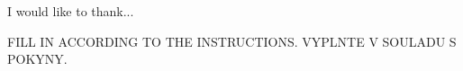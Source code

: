\documentclass[english,bachelor,unicode,oneside,bw]{ctufit-thesis}
\begin{document}
 
\frontmatter\frontmatterinit %


\thispagestyle{empty}\cleardoublepage\maketitle %

\imprintpage %

\tableofcontents %
\listoffigures %
\begingroup
\let\clearpage\relax
\listoftables %
\thectufitlistingscommand
\endgroup

\begin{acknowledgmentpage}
I would like to thank...
\end{acknowledgmentpage}


\begin{declarationpage}
FILL IN ACCORDING TO THE INSTRUCTIONS. VYPLNTE V SOULADU S POKYNY.
\end{declarationpage}

\printabstractpage %
\end{document}
